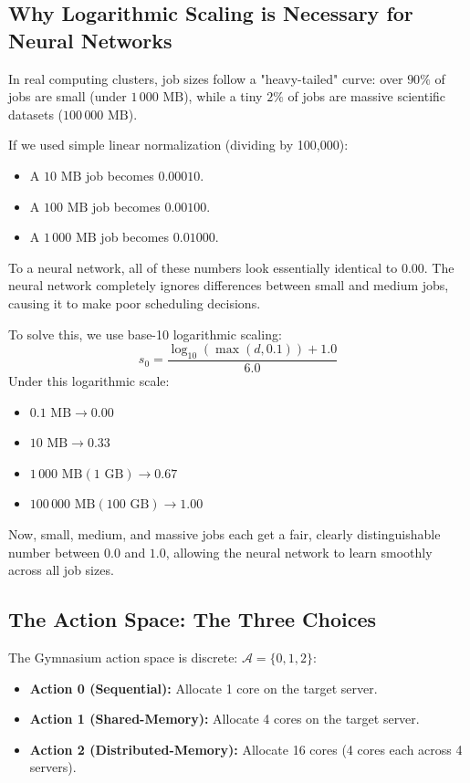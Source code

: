 \documentclass[11pt,a4paper]{article}
\begin{document}
\subsection{Why Logarithmic Scaling is Necessary for Neural Networks}
In real computing clusters, job sizes follow a "heavy-tailed" curve: over $90\%$ of jobs are small (under $1\,000\text{ MB}$), while a tiny $2\%$ of jobs are massive scientific datasets ($100\,000\text{ MB}$).

If we used simple linear normalization (dividing by 100,000):
\begin{itemize}[noitemsep, topsep=1pt]
    \item A $10\text{ MB}$ job becomes $0.00010$.
    \item A $100\text{ MB}$ job becomes $0.00100$.
    \item A $1\,000\text{ MB}$ job becomes $0.01000$.
\end{itemize}
To a neural network, all of these numbers look essentially identical to $0.00$. The neural network completely ignores differences between small and medium jobs, causing it to make poor scheduling decisions.

To solve this, we use base-10 logarithmic scaling:
\begin{equation}
    s_0 = \frac{\log_{10}(\max(d, 0.1)) + 1.0}{6.0}
\end{equation}
Under this logarithmic scale:
\begin{itemize}[noitemsep, topsep=1pt]
    \item $0.1\text{ MB} \longrightarrow 0.00$
    \item $10\text{ MB} \longrightarrow 0.33$
    \item $1\,000\text{ MB} (1\text{ GB}) \longrightarrow 0.67$
    \item $100\,000\text{ MB} (100\text{ GB}) \longrightarrow 1.00$
\end{itemize}
Now, small, medium, and massive jobs each get a fair, clearly distinguishable number between $0.0$ and $1.0$, allowing the neural network to learn smoothly across all job sizes.

\subsection{The Action Space: The Three Choices}
The Gymnasium action space is discrete: $\mathcal{A} = \{0, 1, 2\}$:
\begin{itemize}[noitemsep, topsep=1pt]
    \item \textbf{Action 0 (Sequential):} Allocate 1 core on the target server.
    \item \textbf{Action 1 (Shared-Memory):} Allocate 4 cores on the target server.
    \item \textbf{Action 2 (Distributed-Memory):} Allocate 16 cores (4 cores each across 4 servers).
\end{itemize}
\end{document}
